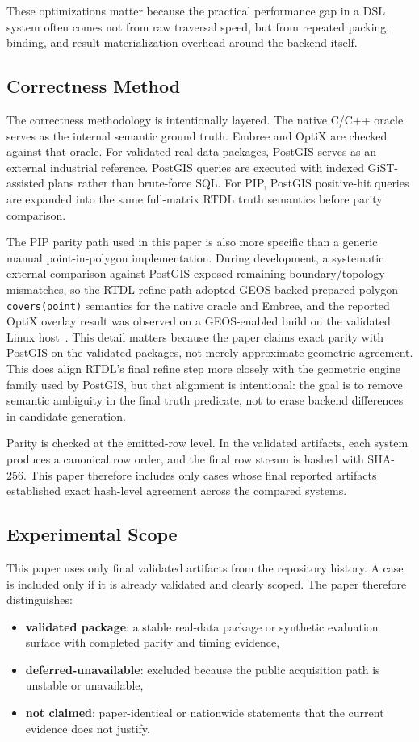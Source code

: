 \documentclass[conference]{IEEEtran}
\begin{document}
These optimizations matter because the practical performance gap in a DSL
system often comes not from raw traversal speed, but from repeated packing,
binding, and result-materialization overhead around the backend itself.

\subsection{Correctness Method}

The correctness methodology is intentionally layered. The native C/C++ oracle
serves as the internal semantic ground truth. Embree and OptiX are checked
against that oracle. For validated real-data packages, PostGIS serves as an
external industrial reference. PostGIS queries are executed with indexed
GiST-assisted plans rather than brute-force SQL. For PIP, PostGIS positive-hit
queries are expanded into the same full-matrix RTDL truth semantics before
parity comparison.

The PIP parity path used in this paper is also more specific than a generic manual
point-in-polygon implementation. During development, a systematic external
comparison against PostGIS exposed remaining boundary/topology mismatches, so
the RTDL refine path adopted
GEOS-backed prepared-polygon \texttt{covers(point)} semantics for the native
oracle and Embree, and the reported OptiX overlay result was observed on a
GEOS-enabled build on the validated Linux host~\cite{geos}. This detail matters
because the paper claims exact parity with PostGIS on the validated packages,
not merely approximate geometric agreement. This does align RTDL's final refine
step more closely with the geometric engine family used by PostGIS, but that
alignment is intentional: the goal is to remove semantic ambiguity in the final
truth predicate, not to erase backend differences in candidate generation.

Parity is checked at the emitted-row level. In the validated artifacts, each
system produces a canonical row order, and the final row stream is hashed with
SHA-256. This paper therefore includes only cases whose final reported
artifacts established exact hash-level agreement across the compared systems.

\subsection{Experimental Scope}

This paper uses only final validated artifacts from the repository history. A
case is included only if it is already validated and clearly scoped. The paper
therefore distinguishes:
\begin{itemize}
\item \textbf{validated package}: a stable real-data package or synthetic
evaluation surface with completed parity and timing evidence,
\item \textbf{deferred-unavailable}: excluded because the public acquisition
path is unstable or unavailable,
\item \textbf{not claimed}: paper-identical or nationwide statements that the
current evidence does not justify.
\end{itemize}
\end{document}
